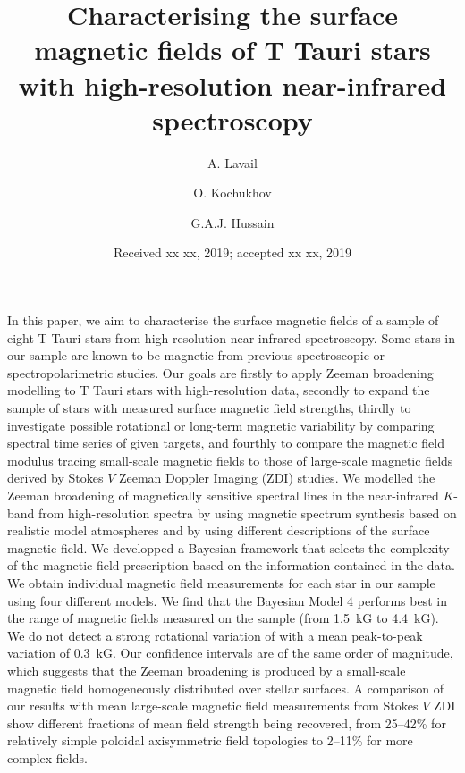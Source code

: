 \documentclass{aa}
\begin{document}
  \title{Characterising the surface magnetic fields of T Tauri stars with high-resolution near-infrared spectroscopy}


  \author{
  A. Lavail
  \and
  O. Kochukhov
  \and
  G.A.J. Hussain
  }


  \date{Received xx xx, 2019; accepted xx xx, 2019}

  \abstract%
{}
   {In this paper, we aim to characterise the surface magnetic fields of a sample of eight T Tauri stars from high-resolution near-infrared spectroscopy. Some stars in our sample are known to be magnetic from previous spectroscopic or spectropolarimetric studies. Our goals are firstly to apply Zeeman broadening modelling to T Tauri stars with high-resolution data, secondly to expand the sample of stars with measured surface magnetic field strengths, thirdly to investigate possible rotational or long-term magnetic variability by comparing spectral time series of given targets, and fourthly to compare the magnetic field modulus {\bb} tracing small-scale magnetic fields to those of large-scale magnetic fields derived by Stokes $V$ Zeeman Doppler Imaging (ZDI) studies.}
   {
   We modelled the Zeeman broadening of magnetically sensitive spectral lines in the near-infrared $K$-band from high-resolution spectra by using magnetic spectrum synthesis based on realistic model atmospheres and by using different descriptions of the surface magnetic field. We developped a Bayesian framework that selects the complexity of the magnetic field prescription based on the information contained in the data. }
   {We obtain individual magnetic field measurements for each star in our sample using four different models. We find that the Bayesian Model 4 performs best in the range of magnetic fields measured on the sample (from 1.5~kG to 4.4~kG). We do not detect a strong rotational variation of {\bb} with a mean peak-to-peak variation of 0.3~kG. Our confidence intervals are of the same order of magnitude, which suggests that the Zeeman broadening is produced by a small-scale magnetic field homogeneously distributed over stellar surfaces. A comparison of our results with mean large-scale magnetic field measurements from Stokes $V$ ZDI show different fractions of mean field strength being recovered, from 25--42\% for relatively simple poloidal axisymmetric field topologies to 2--11\% for more complex fields.}
   {}
\end{document}
